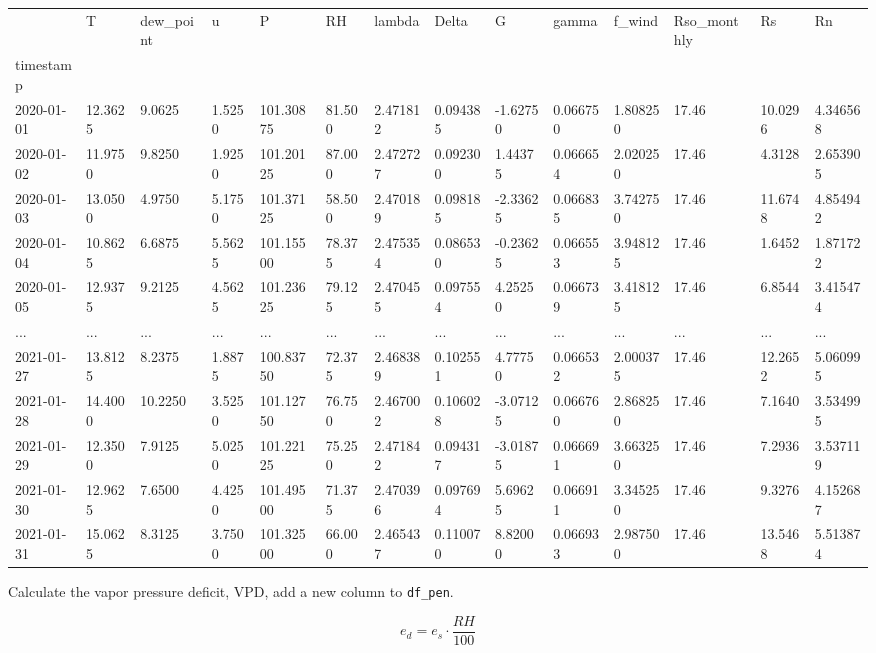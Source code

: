 \documentclass[
  letterpaper,
  DIV=11,
  numbers=noendperiod]{scrreprt}
\begin{document}
\begin{longtable}[]{@{}llllllllllllll@{}}
\toprule()
& T & dew\_point & u & P & RH & lambda & Delta & G & gamma & f\_wind &
Rso\_monthly & Rs & Rn \\
timestamp & & & & & & & & & & & & & \\
\midrule()
\endhead
2020-01-01 & 12.3625 & 9.0625 & 1.5250 & 101.30875 & 81.500 & 2.471812 &
0.094385 & -1.62750 & 0.066750 & 1.808250 & 17.46 & 10.0296 &
4.346568 \\
2020-01-02 & 11.9750 & 9.8250 & 1.9250 & 101.20125 & 87.000 & 2.472727 &
0.092300 & 1.44375 & 0.066654 & 2.020250 & 17.46 & 4.3128 & 2.653905 \\
2020-01-03 & 13.0500 & 4.9750 & 5.1750 & 101.37125 & 58.500 & 2.470189 &
0.098185 & -2.33625 & 0.066835 & 3.742750 & 17.46 & 11.6748 &
4.854942 \\
2020-01-04 & 10.8625 & 6.6875 & 5.5625 & 101.15500 & 78.375 & 2.475354 &
0.086530 & -0.23625 & 0.066553 & 3.948125 & 17.46 & 1.6452 & 1.871722 \\
2020-01-05 & 12.9375 & 9.2125 & 4.5625 & 101.23625 & 79.125 & 2.470455 &
0.097554 & 4.25250 & 0.066739 & 3.418125 & 17.46 & 6.8544 & 3.415474 \\
... & ... & ... & ... & ... & ... & ... & ... & ... & ... & ... & ... &
... & ... \\
2021-01-27 & 13.8125 & 8.2375 & 1.8875 & 100.83750 & 72.375 & 2.468389 &
0.102551 & 4.77750 & 0.066532 & 2.000375 & 17.46 & 12.2652 & 5.060995 \\
2021-01-28 & 14.4000 & 10.2250 & 3.5250 & 101.12750 & 76.750 & 2.467002
& 0.106028 & -3.07125 & 0.066760 & 2.868250 & 17.46 & 7.1640 &
3.534995 \\
2021-01-29 & 12.3500 & 7.9125 & 5.0250 & 101.22125 & 75.250 & 2.471842 &
0.094317 & -3.01875 & 0.066691 & 3.663250 & 17.46 & 7.2936 & 3.537119 \\
2021-01-30 & 12.9625 & 7.6500 & 4.4250 & 101.49500 & 71.375 & 2.470396 &
0.097694 & 5.69625 & 0.066911 & 3.345250 & 17.46 & 9.3276 & 4.152687 \\
2021-01-31 & 15.0625 & 8.3125 & 3.7500 & 101.32500 & 66.000 & 2.465437 &
0.110070 & 8.82000 & 0.066933 & 2.987500 & 17.46 & 13.5468 & 5.513874 \\
\bottomrule()
\end{longtable}

Calculate the vapor pressure deficit, VPD, add a new column to
\texttt{df\_pen}.

\[
e_d = e_s\cdot \frac{RH}{100}
\]
\end{document}
